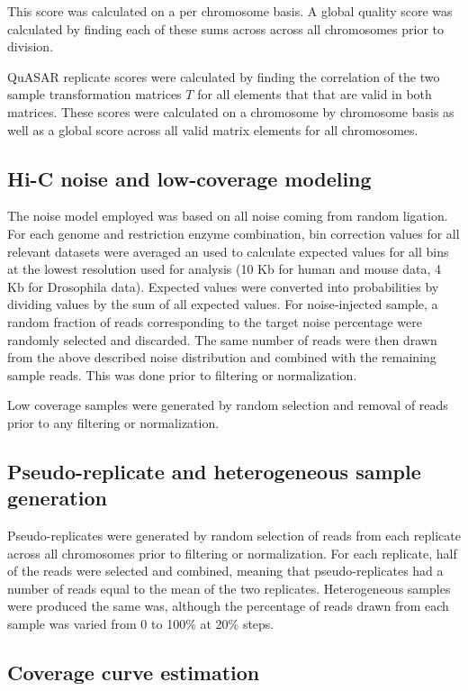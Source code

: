 This score was calculated on a per chromosome basis. A global quality score was calculated by finding each of these sums across across all chromosomes prior to division.

QuASAR replicate scores were calculated by finding the correlation of the two sample transformation matrices $T$ for all elements that that are valid in both matrices. These scores were calculated on a chromosome by chromosome basis as well as a global score across all valid matrix elements for all chromosomes.

\subsection{Hi-C noise and low-coverage modeling}

The noise model employed was based on all noise coming from random ligation. For each genome and restriction enzyme combination, bin correction values for all relevant datasets were averaged an used to calculate expected values for all bins at the lowest resolution used for analysis (10 Kb for human and mouse data, 4 Kb for Drosophila data). Expected values were converted into probabilities by dividing values by the sum of all expected values. For noise-injected sample, a random fraction of reads corresponding to the target noise percentage were randomly selected and discarded. The same number of reads were then drawn from the above described noise distribution and combined with the remaining sample reads. This was done prior to filtering or normalization.

Low coverage samples were generated by random selection and removal of reads prior to any filtering or normalization.

\subsection{Pseudo-replicate and heterogeneous sample generation}

Pseudo-replicates were generated by random selection of reads from each replicate across all chromosomes prior to filtering or normalization. For each replicate, half of the reads were selected and combined, meaning that pseudo-replicates had a number of reads equal to the mean of the two replicates. Heterogeneous samples were produced the same was, although the percentage of reads drawn from each sample was varied from 0 to 100\% at 20\% steps.

\subsection{Coverage curve estimation}

